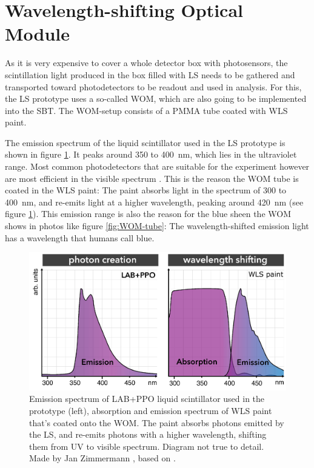 \section{Wavelength-shifting Optical Module}

	As it is very expensive to cover a whole detector box with photosensors, the scintillation light produced in the box filled with \ac{LS} needs to be gathered and transported toward photodetectors to be readout and used in analysis. For this, the \ac{LS} prototype uses a so-called \ac{WOM}, which are also going to be implemented into the \ac{SBT}. The \ac{WOM}-setup consists of a \ac{PMMA} tube coated with \ac{WLS} paint.
	

	
	The emission spectrum of the liquid scintillator used in the \ac{LS} prototype is shown in figure \ref{fig:absorption-emission}. It peaks around 350 to \SI{400}{\nano\meter}, which lies in the ultraviolet range. Most common photodetectors that are suitable for the experiment however are most efficient in the visible spectrum \cite{SPECTRAL-SEMICONDUCTOR}. This is the reason the \ac{WOM} tube is coated in the \ac{WLS} paint: The paint absorbs light in the spectrum of 300 to \SI{400}{\nano\meter}, and re-emits light at a higher wavelength, peaking around \SI{420}{\nano\meter} (see figure \ref{fig:absorption-emission}). This emission range is also the reason for the blue sheen the \ac{WOM} shows in photos like figure \ref{fig:WOM-tube}: The wavelength-shifted emission light has a wavelength that humans call blue.
	
	\begin{figure}[h]
		\centering
		\includegraphics[width=.7\linewidth]{pictures/absorption-emission.png}
		\caption{Emission spectrum of \ac{LAB}+\ac{PPO} liquid scintillator used in the prototype (left), absorption and emission spectrum of \ac{WLS} paint that's coated onto the \ac{WOM}. The paint absorbs photons emitted by the \ac{LS}, and re-emits photons with a higher wavelength, shifting them from UV to visible spectrum. Diagram not true to detail. Made by Jan Zimmermann \cite{ZIMMERMANN}, based on \cite{EHLERT}.}
		\label{fig:absorption-emission}
	\end{figure}
	
